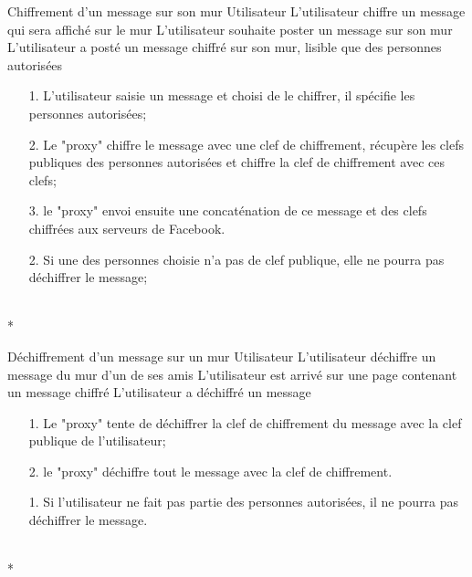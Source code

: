 \documentclass[a4paper,11pt,french]{article}
\begin{document}
\fiche
	{Chiffrement d'un message sur son mur}
	{Utilisateur}
	{L'utilisateur chiffre un message qui sera affiché sur le mur}
	{}
	{L'utilisateur souhaite poster un message sur son mur}
	{L'utilisateur a posté un message chiffré sur son mur, lisible que des personnes autorisées}
	{\begin{itemize}
	    \item[]
	  \item[1.] L'utilisateur saisie un message et choisi de le chiffrer,
          il spécifie les personnes autorisées;
	\end{itemize}
	}
	{\begin{itemize}
        \item[]
		\item[2.] Le "proxy" chiffre le message avec une clef 
        de chiffrement, récupère les clefs publiques
        des personnes autorisées et chiffre la clef de chiffrement
        avec ces clefs;
		\item[3.] le "proxy" envoi ensuite une concaténation de 
        ce message et des clefs chiffrées aux serveurs de Facebook.
	\end{itemize}
	}
	{}
\flots
    {\begin{itemize}
    \item[]
    \item[2.] Si une des personnes choisie n'a pas de clef publique,
        elle ne pourra pas déchiffrer le message;
    \end{itemize}
    }
	{}    
\\*

\fiche
	{Déchiffrement d'un message sur un mur}
	{Utilisateur}
	{L'utilisateur déchiffre un message du mur d'un de ses amis}
	{}
	{L'utilisateur est arrivé sur une page contenant un message chiffré}
	{L'utilisateur a déchiffré un message}
    {}
	{\begin{itemize}
        \item[]
		\item[1.] Le "proxy" tente de déchiffrer la clef de chiffrement
            du message avec la clef publique de l'utilisateur;
		\item[2.] le "proxy" déchiffre tout le message avec la clef
            de chiffrement.
	\end{itemize}
	}
	{}
\flots
    {}
    {\begin{itemize}
    \item[]
    \item[1.] Si l'utilisateur ne fait pas partie des personnes
        autorisées, il ne pourra pas déchiffrer le message.
    \end{itemize}
    }
	{}    
\\*
\end{document}
